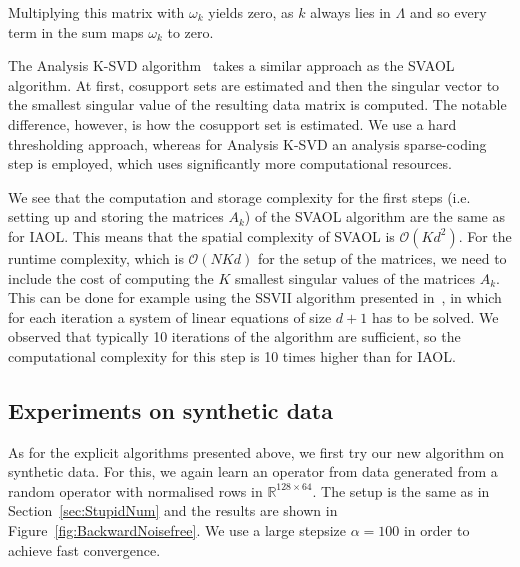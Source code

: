 \documentclass[11pt, onecolumn, journal,compsoc]{IEEEtran}
\newcommand{\R}{{\mathbb{R}}}
\newcommand{\Ocal}{\mathcal{O}}
\theoremstyle{plain}
\theoremstyle{remark}
\begin{document}
Multiplying this matrix with $\omega_k$ yields zero, as $k$ always lies in $\Lambda$ and so every term in the sum maps $\omega_k$ to zero.

The Analysis K-SVD algorithm~\cite{rupeel13} takes a similar approach as the SVAOL algorithm. At first, cosupport sets are estimated and then the singular vector to the smallest singular value of the resulting data matrix is computed. The notable difference, however, is how the cosupport set is estimated. We use a hard thresholding approach, whereas for Analysis K-SVD an analysis sparse-coding step is employed, which uses significantly more computational resources.

We see that the computation and storage complexity for the first steps (i.e. setting up and storing the matrices $A_k$) of the SVAOL algorithm are the same as for IAOL. This means that the spatial complexity of SVAOL is $\Ocal(Kd^2)$. For the runtime complexity, which is $\Ocal(NKd)$ for the setup of the matrices, we need to include the cost of computing the $K$ smallest singular values of the matrices $A_k$. This can be done for example using the SSVII algorithm presented in~\cite{schwetlick2003iterative}, in which for each iteration a system of linear equations of size $d+1$ has to be solved. We observed that typically 10 iterations of the algorithm are sufficient, so the computational complexity for this step is 10 times higher than for IAOL.

\subsection{Experiments on synthetic data}\label{sec:comparison}
As for the explicit algorithms presented above, we first try our new algorithm on synthetic data. For this, we again learn an operator from data generated from a random operator with normalised rows in $\R^{128\times 64}$. The setup is the same as in Section~\ref{sec:StupidNum} and the results are shown in Figure~\ref{fig:BackwardNoisefree}. We use a large stepsize $\alpha = 100$ in order to achieve fast convergence.
%
\end{document}
